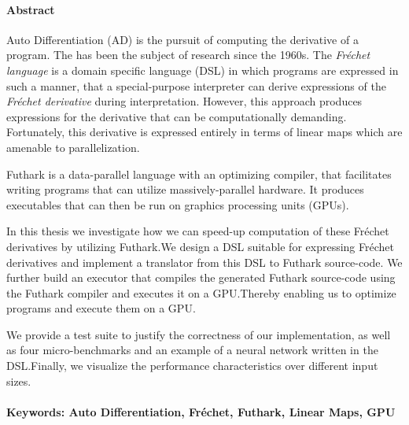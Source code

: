 \paragraph{Abstract}

Auto Differentiation (AD) is the pursuit of computing the derivative of a
program.  The has been the subject of research since the 1960s\cite{adsurvey}.
The \textit{Fréchet language} is a domain specific language (DSL) in which
programs are expressed in such a manner, that a special-purpose interpreter can
derive expressions of the \textit{Fréchet derivative} during interpretation.
However, this approach produces expressions for the derivative that can be
computationally demanding.  Fortunately, this derivative is expressed entirely
in terms of linear maps which are amenable to parallelization.

Futhark\cite{futhark} is a data-parallel language with an optimizing compiler,
that facilitates writing programs that can utilize massively-parallel
hardware.  It produces executables that can then be run on graphics processing
units (GPUs).\@

In this thesis we investigate how we can speed-up computation of these Fréchet
derivatives by utilizing Futhark.\@  We design a DSL suitable for expressing
Fréchet derivatives and implement a translator from this DSL to Futhark
source-code.  We further build an executor that compiles the generated Futhark
source-code using the Futhark compiler and executes it on a GPU.\@  Thereby
enabling us to optimize programs and execute them on a GPU.\@

We provide a test suite to justify the correctness of our implementation, as
well as four micro-benchmarks and an example of a neural network written in the
DSL.\@ Finally, we visualize the performance characteristics over different
input sizes.

\paragraph{Keywords: Auto Differentiation, Fréchet, Futhark, Linear Maps, GPU}


